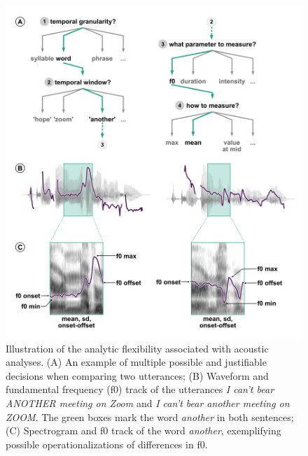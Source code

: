 \documentclass[Review,times,sageh]{sagej}
\begin{document}
\begin{figure}
\includegraphics[width=1\linewidth]{../figs/ForkingPaths} \caption{Illustration of the analytic flexibility associated with acoustic analyses. (A) An example of multiple possible and justifiable decisions when comparing two utterances; (B) Waveform and fundamental frequency (f0) track of the utterances \emph{I can't bear ANOTHER meeting on Zoom} and \emph{I can't bear another meeting on ZOOM}. The green boxes mark the word \emph{another} in both sentences; (C) Spectrogram and f0 track of the word \emph{another}, exemplifying possible operationalizations of differences in f0.}\label{fig:forkingPaths}
\end{figure}
\end{document}
